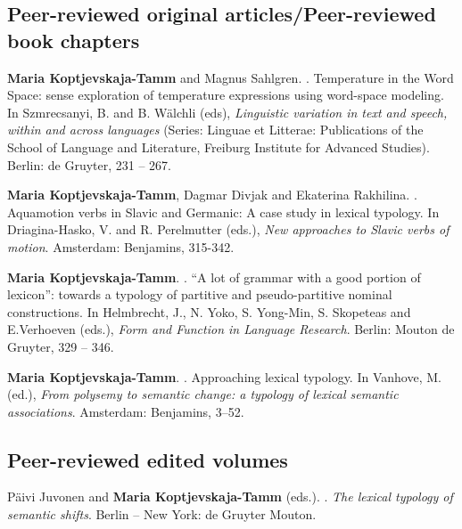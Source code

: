 \documentclass[a4paper]{article}
\begin{document}
		\subsection*{\textbf{Peer-reviewed original articles/Peer-reviewed book chapters}}
	  
	  
	  
	  	   \textbf{Maria Koptjevskaja-Tamm} and Magnus Sahlgren.
	  	   .
	  	   \newblock Temperature in the Word Space: sense exploration of temperature expressions using word-space modeling. 
	  	   \newblock In Szmrecsanyi, B. and B. Wälchli (eds),
	  	  \textit{Linguistic variation in text and speech, within
	  	   and across languages} 	  (Series: Linguae et Litterae: Publications of the School of Language
	  	   and Literature, Freiburg Institute for Advanced Studies). Berlin: de Gruyter, 231 – 267.
	  
	  	
	  	   \textbf{Maria Koptjevskaja-Tamm}, Dagmar Divjak and Ekaterina Rakhilina.
	  	  .
	  	  \newblock Aquamotion verbs in Slavic and Germanic: A case study in lexical typology. 
	  	  \newblock In Driagina-Hasko, V. and R. Perelmutter (eds.), \textit{New approaches to Slavic verbs of motion}. Amsterdam: Benjamins, 315-342.
	  	  
	  	  	   
	  	  	   	   \textbf{Maria Koptjevskaja-Tamm}.
	  	  	  . 
	  	  	  \newblock “A lot of grammar with a good portion of lexicon”: towards a typology of partitive and pseudo-partitive nominal constructions. 
	  	  	  \newblock In Helmbrecht, J., N. Yoko, S. Yong-Min, S. Skopeteas and E.Verhoeven (eds.),\textit{ Form and Function in Language Research}. Berlin: Mouton de Gruyter, 329 – 346.
	  	  
	  	  
	  	
	  
	   \textbf{Maria Koptjevskaja-Tamm}.
	    .
	    \newblock Approaching   lexical typology.
	    \newblock In Vanhove, M. (ed.), \textit{From polysemy to semantic change: a typology of lexical semantic associations}. Amsterdam: Benjamins, 3–52.
	    

	
	
	 
	 
	  \subsection*{\textbf{Peer-reviewed edited volumes}}
	 
	
		   Päivi Juvonen  and \textbf{Maria Koptjevskaja-Tamm} (eds.).
		  .
		  \newblock \textit{The lexical typology of semantic shifts}.
		 \newblock  Berlin – New York: de Gruyter Mouton.
		 
\end{document}
